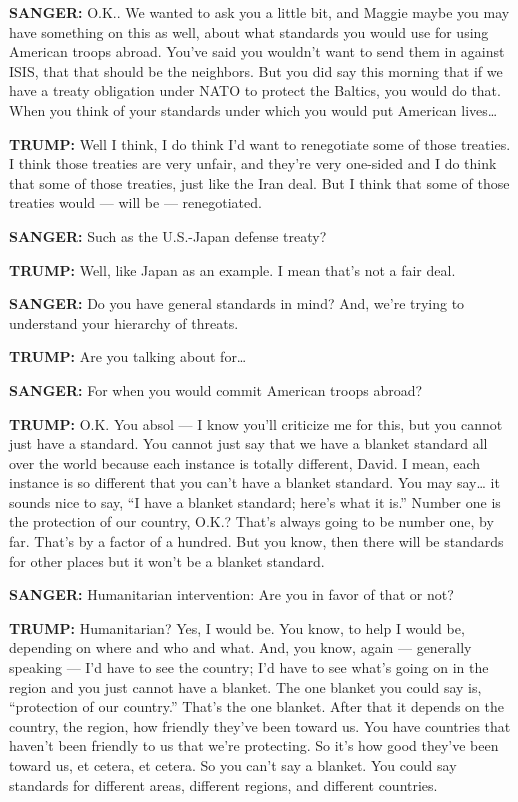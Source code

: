 \textbf{SANGER:} O.K.. We wanted to ask you a little bit, and Maggie
maybe you may have something on this as well, about what standards you
would use for using American troops abroad. You've said you wouldn't
want to send them in against ISIS, that that should be the neighbors.
But you did say this morning that if we have a treaty obligation under
NATO to protect the Baltics, you would do that. When you think of your
standards under which you would put American lives\ldots{}

\textbf{TRUMP:} Well I think, I do think I'd want to renegotiate some of
those treaties. I think those treaties are very unfair, and they're very
one-sided and I do think that some of those treaties, just like the Iran
deal. But I think that some of those treaties would --- will be ---
renegotiated.

\textbf{SANGER:} Such as the U.S.-Japan defense treaty?

\textbf{TRUMP:} Well, like Japan as an example. I mean that's not a fair
deal.

\textbf{SANGER:} Do you have general standards in mind? And, we're
trying to understand your hierarchy of threats.

\textbf{TRUMP:} Are you talking about for\ldots{}

\textbf{SANGER:} For when you would commit American troops abroad?

\textbf{TRUMP:} O.K. You absol --- I know you'll criticize me for this,
but you cannot just have a standard. You cannot just say that we have a
blanket standard all over the world because each instance is totally
different, David. I mean, each instance is so different that you can't
have a blanket standard. You may say\ldots{} it sounds nice to say, ``I
have a blanket standard; here's what it is.'' Number one is the
protection of our country, O.K.? That's always going to be number one,
by far. That's by a factor of a hundred. But you know, then there will
be standards for other places but it won't be a blanket standard.

\textbf{SANGER:} Humanitarian intervention: Are you in favor of that or
not?

\textbf{TRUMP:} Humanitarian? Yes, I would be. You know, to help I would
be, depending on where and who and what. And, you know, again ---
generally speaking --- I'd have to see the country; I'd have to see
what's going on in the region and you just cannot have a blanket. The
one blanket you could say is, ``protection of our country.'' That's the
one blanket. After that it depends on the country, the region, how
friendly they've been toward us. You have countries that haven't been
friendly to us that we're protecting. So it's how good they've been
toward us, et cetera, et cetera. So you can't say a blanket. You could
say standards for different areas, different regions, and different
countries.

